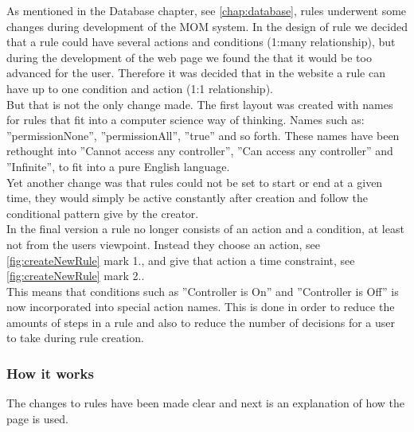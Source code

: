 As mentioned in the Database chapter, see \vref{chap:database}, rules underwent some changes during development of the MOM system. In the design of rule we decided that a rule could have several actions and conditions (1:many relationship), but during the development of the web page we found the that it would be too advanced for the user. Therefore it was decided that in the website a rule can have up to one condition and action (1:1 relationship).\\ 
But that is not the only change made. The first layout was created with names for rules that fit into a computer science way of thinking. Names such as: ''permissionNone'', ''permissionAll'', ''true'' and so forth. These names have been rethought into ''Cannot access any controller'', ''Can access any controller'' and ''Infinite'', to fit into a pure English language.\\
Yet another change was that rules could not be set to start or end at a given time, they would simply be active constantly after creation and follow the conditional pattern give by the creator.\\
In the final version a rule no longer consists of an action and a condition, at least not from the users viewpoint. Instead they choose an action, see \ref{fig:createNewRule} mark 1., and give that action a time constraint, see \ref{fig:createNewRule} mark 2..\\
This means that conditions such as ''Controller is On'' and ''Controller is Off'' is now incorporated into special action names.
This is done in order to reduce the amounts of steps in a rule and also to reduce the number of decisions for a user to take during rule creation.

\subsubsection{How it works}
The changes to rules have been made clear and next is an explanation of how the page is used.\\

